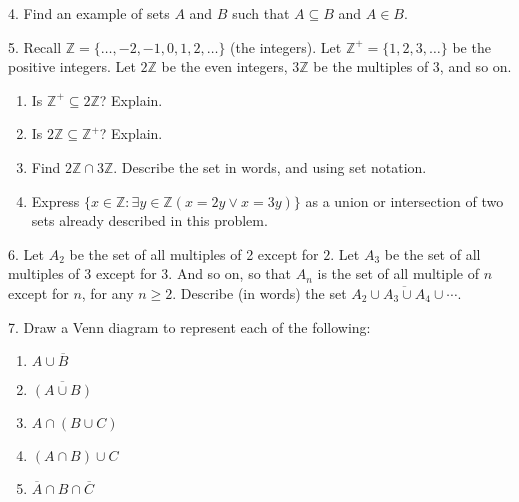 \documentclass[10pt,]{book}
\theoremstyle{plain}
\theoremstyle{definition}
\theoremstyle{definition}
\numberwithin{equation}{chapter}
\newcommand{\Z}{\mathbb Z}
\newcommand{\st}{:}
\renewcommand{\bar}{\overline}
\begin{document}
\begin{exerciselist}
\par\smallskip
\item[4.]\hypertarget{exercise-31}{}\hypertarget{p-512}{}%
Find an example of sets \(A\) and \(B\) such that \(A \subseteq B\) and \(A \in B\).%
\par\smallskip
\item[5.]\hypertarget{exercise-32}{}\hypertarget{p-514}{}%
Recall \(\Z = \{\ldots,-2,-1,0, 1,2,\ldots\}\) (the integers). Let \(\Z^+ = \{1, 2, 3, \ldots\}\) be the positive integers. Let \(2\Z\) be the even integers, \(3\Z\) be the multiples of 3, and so on.%
\par
\hypertarget{p-515}{}%
\leavevmode%
\begin{enumerate}[label=(\alph*)]
\item\hypertarget{li-348}{}\hypertarget{p-516}{}%
Is \(\Z^+ \subseteq 2\Z\)? Explain.%
\item\hypertarget{li-349}{}\hypertarget{p-517}{}%
Is \(2\Z \subseteq \Z^+\)? Explain.%
\item\hypertarget{li-350}{}\hypertarget{p-518}{}%
Find \(2\Z \cap 3\Z\). Describe the set in words, and using set notation.%
\item\hypertarget{li-351}{}\hypertarget{p-519}{}%
Express \(\{x \in \Z \st \exists y\in \Z (x = 2y \vee x = 3y)\}\) as a union or intersection of two sets already described in this problem.%
\end{enumerate}
%
\par\smallskip
\item[6.]\hypertarget{exercise-33}{}\hypertarget{p-523}{}%
Let \(A_2\) be the set of all multiples of 2 except for \(2\). Let \(A_3\) be the set of all multiples of 3 except for 3. And so on, so that \(A_n\) is the set of all multiple of \(n\) except for \(n\), for any \(n \ge 2\). Describe (in words) the set \(\bar{A_2 \cup A_3 \cup A_4 \cup \cdots}\).%
\par\smallskip
\item[7.]\hypertarget{exercise-34}{}\hypertarget{p-524}{}%
Draw a Venn diagram to represent each of the following: \leavevmode%
\begin{enumerate}[label=(\alph*)]
\item\hypertarget{li-356}{}\(A \cup \bar B\)%
\item\hypertarget{li-357}{}\(\bar{(A \cup B)}\)%
\item\hypertarget{li-358}{}\(A \cap (B \cup C)\)%
\item\hypertarget{li-359}{}\((A \cap B) \cup C\)%
\item\hypertarget{li-360}{}\(\bar A \cap B \cap \bar C\)%

\end{enumerate}
\end{exerciselist}
\end{document}
